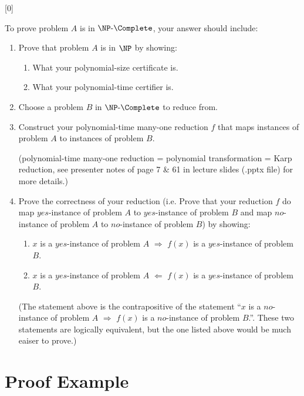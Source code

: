 [0]

To prove problem $A$ is in $\NP \text{-} \Complete$, your answer should include:
\begin{enumerate}

  \item Prove that problem $A$ is in $\NP$ by showing:
  \begin{enumerate}
      \item What your {\color{red} polynomial-size} certificate is.
      \item What your {\color{red} polynomial-time} certifier is.
  \end{enumerate}

  \item Choose a problem $B$ in $\NP \text{-} \Complete$ to reduce from.
  
  \item Construct your {\color{red} polynomial-time many-one reduction} $f$ that maps instances of problem $A$ to instances of problem $B$. 
  
  (polynomial-time many-one reduction = polynomial transformation = Karp reduction, see presenter notes of page 7 \& 61 in lecture slides (.pptx file) for more details.) 

  \item Prove the correctness of your reduction (i.e. Prove that your reduction $f$ do map $yes$-instance of problem $A$ to $yes$-instance of problem $B$ and map $no$-instance of problem $A$ to $no$-instance of problem $B$) by showing:
  \begin{enumerate}
      \item $x$ is a $yes$-instance of problem $A$ $\Rightarrow$ $f(x)$ is a $yes$-instance of problem $B$.
      \item $x$ is a $yes$-instance of problem $A$ $\Leftarrow$ $f(x)$ is a $yes$-instance of problem $B$.
  \end{enumerate}
  (The statement above is the contrapositive of the statement ``$x$ is a $no$-instance of problem $A$ $\Rightarrow$ $f(x)$ is a $no$-instance of problem $B$.''. These two statements are logically equivalent, but the one listed above would be much eaiser to prove.)
\end{enumerate}


\section*{Proof Example}

